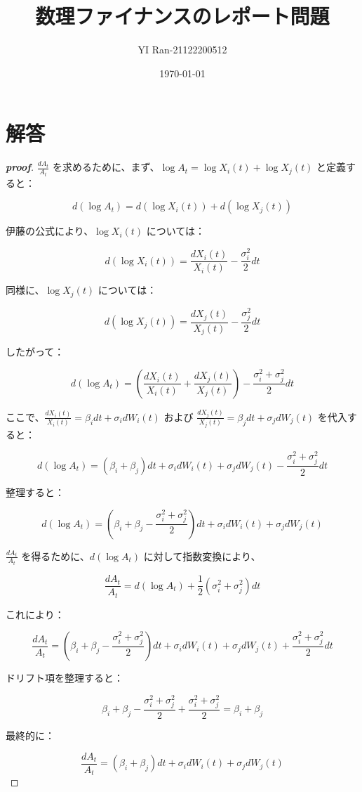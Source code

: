 \documentclass[a4paper,11pt]{jsarticle}
\title{\vspace{-4cm}数理ファイナンスのレポート問題}
\author{YI Ran-21122200512}
\date{\today}
\begin{document}
\maketitle
\vspace{-0.4cm}
\section*{解答}
\begin{proof}[\textbf{proof}]
  $\frac{dA_t}{A_t}$ を求めるために、まず、$\log A_t = \log X_i(t) + \log X_j(t)$ と定義すると：  

\[  
d(\log A_t) = d(\log X_i(t)) + d(\log X_j(t))  
\]  

伊藤の公式により、$\log X_i(t)$ については：  

\[  
d(\log X_i(t)) = \frac{dX_i(t)}{X_i(t)} - \frac{\sigma_i^2}{2}dt  
\]  

同様に、$\log X_j(t)$ については：  

\[  
d(\log X_j(t)) = \frac{dX_j(t)}{X_j(t)} - \frac{\sigma_j^2}{2}dt  
\]  

したがって：  

\[  
d(\log A_t) = \left(\frac{dX_i(t)}{X_i(t)} + \frac{dX_j(t)}{X_j(t)}\right) - \frac{\sigma_i^2 + \sigma_j^2}{2}dt  
\]  

ここで、$\frac{dX_i(t)}{X_i(t)} = \beta_idt + \sigma_idW_i(t)$ および $\frac{dX_j(t)}{X_j(t)} = \beta_jdt + \sigma_jdW_j(t)$ を代入すると：  

\[  
d(\log A_t) = (\beta_i + \beta_j)dt + \sigma_idW_i(t) + \sigma_jdW_j(t) - \frac{\sigma_i^2 + \sigma_j^2}{2}dt  
\]  

整理すると：  

\[  
d(\log A_t) = \left(\beta_i + \beta_j - \frac{\sigma_i^2 + \sigma_j^2}{2}\right)dt + \sigma_idW_i(t) + \sigma_jdW_j(t)  
\]  

$\frac{dA_t}{A_t}$ を得るために、$d(\log A_t)$ に対して指数変換により、  

\[  
\frac{dA_t}{A_t} = d(\log A_t) + \frac{1}{2}(\sigma_i^2 + \sigma_j^2)dt  
\]  

これにより：  

\[  
\frac{dA_t}{A_t} = \left(\beta_i + \beta_j - \frac{\sigma_i^2 + \sigma_j^2}{2}\right)dt + \sigma_idW_i(t) + \sigma_jdW_j(t) + \frac{\sigma_i^2 + \sigma_j^2}{2}dt  
\]  

ドリフト項を整理すると：  

\[  
\beta_i + \beta_j - \frac{\sigma_i^2 + \sigma_j^2}{2} + \frac{\sigma_i^2 + \sigma_j^2}{2} = \beta_i + \beta_j  
\]  

最終的に：  

\[  
\frac{dA_t}{A_t} = (\beta_i + \beta_j)dt + \sigma_idW_i(t) + \sigma_jdW_j(t)  
\]
\end{proof}
\end{document}
